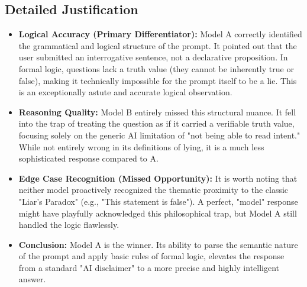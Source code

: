 \documentclass[11pt, a4paper]{article}
\begin{document}
\subsection*{Detailed Justification}
\begin{itemize}
    \item \textbf{Logical Accuracy (Primary Differentiator):} Model A correctly identified the grammatical and logical structure of the prompt. It pointed out that the user submitted an interrogative sentence, not a declarative proposition. In formal logic, questions lack a truth value (they cannot be inherently true or false), making it technically impossible for the prompt itself to be a lie. This is an exceptionally astute and accurate logical observation.
    
    \item \textbf{Reasoning Quality:} Model B entirely missed this structural nuance. It fell into the trap of treating the question as if it carried a verifiable truth value, focusing solely on the generic AI limitation of "not being able to read intent." While not entirely wrong in its definitions of lying, it is a much less sophisticated response compared to A.
    
    \item \textbf{Edge Case Recognition (Missed Opportunity):} It is worth noting that neither model proactively recognized the thematic proximity to the classic "Liar's Paradox" (e.g., "This statement is false"). A perfect, "model" response might have playfully acknowledged this philosophical trap, but Model A still handled the logic flawlessly.
    
    \item \textbf{Conclusion:} Model A is the winner. Its ability to parse the semantic nature of the prompt and apply basic rules of formal logic, elevates the response from a standard "AI disclaimer" to a more precise and highly intelligent answer.
\end{itemize}
\end{document}
